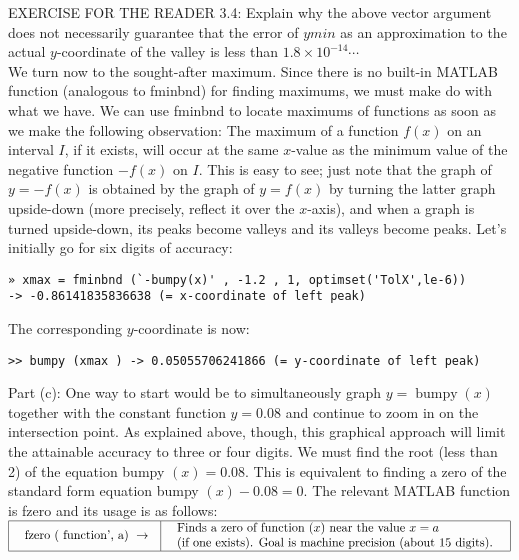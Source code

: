 \documentclass[../main.tex]{subfiles}
\begin{document}
EXERCISE FOR THE READER 3.4: Explain why the above vector argument does not necessarily guarantee that the error of $ymin$ as an approximation to the actual $y$-coordinate of the valley is less than $1.8 \times 10^{-14} \cdots$\\

We turn now to the sought-after maximum. Since there is no built-in MATLAB function (analogous to fminbnd) for finding maximums, we must make do with what we have. We can use fminbnd to locate maximums of functions as soon as we make the following observation: The maximum of a function $f(x)$ on an interval $I$, if it exists, will occur at the same $x$-value as the minimum value of the negative function $-f(x)$ on $I$. This is easy to see; just note that the graph of $y=-f(x)$ is obtained by the graph of $y=f(x)$ by turning the latter graph upside-down (more precisely, reflect it over the $x$-axis), and when a graph is turned upside-down, its peaks become valleys and its valleys become peaks. Let's initially go for six digits of accuracy:\\

\begin{verbatim}
» xmax = fminbnd (`-bumpy(x)' , -1.2 , 1, optimset('TolX',le-6))  
-> -0.86141835836638 (= x-coordinate of left peak)
\end{verbatim}


The corresponding $y$-coordinate is now:

\begin{verbatim}
>> bumpy (xmax ) -> 0.05055706241866 (= y-coordinate of left peak) 
\end{verbatim}

Part (c): One way to start would be to simultaneously graph $y=\operatorname{bumpy}(x)$ together with the constant function $y=0.08$ and continue to zoom in on the intersection point. As explained above, though, this graphical approach will limit the attainable accuracy to three or four digits. We must find the root (less than 2) of the equation bumpy $(x)=0.08$. This is equivalent to finding a zero of the standard form equation bumpy $(x)-0.08=0$. The relevant MATLAB function is fzero and its usage is as follows:\\

$
\begin{array}{|l|l|}
\hline \begin{array}{l}
\text { fzero ( function', a) } \rightarrow \\
\end{array} & \begin{array}{l}
\text {  Finds a zero of function $(x)$ near the value $x=a$ } \\
\text { (if one exists). Goal is machine precision (about 15 digits). }
\end{array} \\
\hline
\end{array}
$\\
\end{document}
